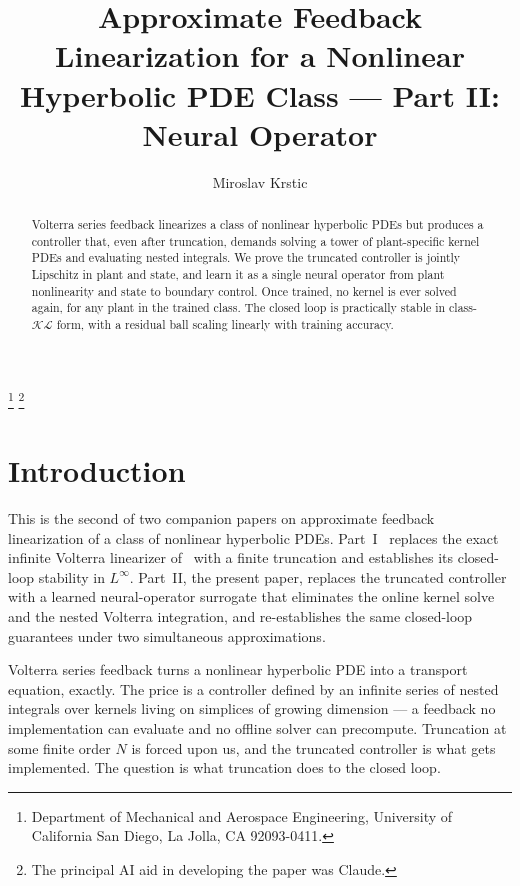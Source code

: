 \documentclass[twocolumn,amsthm]{autart}
\theoremstyle{plain}
\theoremstyle{definition}
\begin{document}
\begin{frontmatter}

\title{\bfseries Approximate Feedback Linearization for a
Nonlinear Hyperbolic PDE Class --- Part II:
Neural Operator}
\label{title:main}

\author{Miroslav Krstic}
\thanks{Department of Mechanical and Aerospace Engineering, University of California San Diego, La Jolla, CA 92093-0411.}
\thanks{The principal AI aid in developing the paper was Claude.}

\begin{abstract}
Volterra series feedback linearizes a class of nonlinear hyperbolic PDEs but produces a controller that, even after truncation, demands solving a tower of plant-specific kernel PDEs and evaluating nested integrals. We prove the truncated controller is jointly Lipschitz in plant and state, and learn it as a single neural operator from plant nonlinearity and state to boundary control. Once trained, no kernel is ever solved again, for any plant in the trained class. The closed loop is practically stable in class-$\mathcal{KL}$ form, with a residual ball scaling linearly with training accuracy.
\end{abstract}

\end{frontmatter}

\section{Introduction}
\label{sec:intro}

This is the second of two companion papers on approximate feedback linearization of a class of nonlinear hyperbolic PDEs. Part~I~\cite{krstic2026feedbacklinearizationhyperbolicpdes-trunc} replaces the exact infinite Volterra linearizer of~\cite{krstic2026feedbacklinearizationhyperbolicpdes} with a finite truncation and establishes its closed-loop stability in $L^\infty$. Part~II, the present paper, replaces the truncated controller with a learned neural-operator surrogate that eliminates the online kernel solve and the nested Volterra integration, and re-establishes the same closed-loop guarantees under two simultaneous approximations.

Volterra series feedback turns a nonlinear hyperbolic PDE into a transport equation, exactly. The price is a controller defined by an infinite series of nested integrals over kernels living on simplices of growing dimension --- a feedback no implementation can evaluate and no offline solver can precompute. Truncation at some finite order $N$ is forced upon us, and the truncated controller is what gets implemented. The question is what truncation does to the closed loop.
\end{document}
